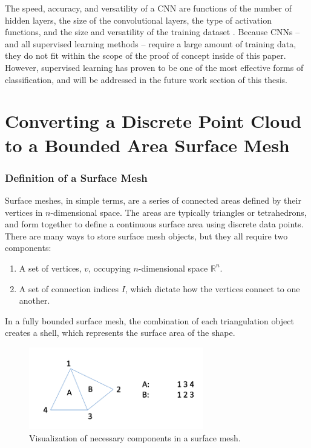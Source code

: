 \documentclass[12pt]{drexelthesis}
\let\Oldsection\section
\renewcommand{\section}{\FloatBarrier\Oldsection}
\let\Oldsubsubsection\subsubsection
\renewcommand{\subsubsection}{\FloatBarrier\Oldsubsubsection}
\begin{document}
The speed, accuracy, and versatility of a CNN are functions of the number of hidden layers, the size of the convolutional layers, the type of activation functions, and the size and versatility of the training dataset \cite{RN7}. Because CNNs -- and all supervised learning methods -- require a large amount of training data, they do not fit within the scope of the proof of concept inside of this paper. However, supervised learning has proven to be one of the most effective forms of classification, and will be addressed in the future work section of this thesis.





\section{Converting a Discrete Point Cloud to a Bounded Area Surface Mesh}
\label{subsec:meshing}
\subsubsection{Definition of a Surface Mesh}
\label{subsubsec:surfdef}
Surface meshes, in simple terms, are a series of connected areas defined by their vertices in $n$-dimensional space. The areas are typically triangles or tetrahedrons, and form together to define a continuous surface area using discrete data points. There are many ways to store surface mesh objects, but they all require two components:

\begin{enumerate}
	\item A set of vertices, $v$, occupying $n$-dimensional space $\mathbb{R}^{n}$.
	\item A set of connection indices $I$, which dictate how the vertices connect to one another.
\end{enumerate}

In a fully bounded surface mesh, the combination of each triangulation object creates a shell, which represents the surface area of the shape.

\begin{figure}[!ht]
	\centering
	\includegraphics[width=3in]{points2surface/surface_mesh.png}
	\caption[Simple example of surface mesh components]{Visualization of necessary components in a surface mesh.}
	\label{meshing:surface_mesh}
\end{figure}
\end{document}
